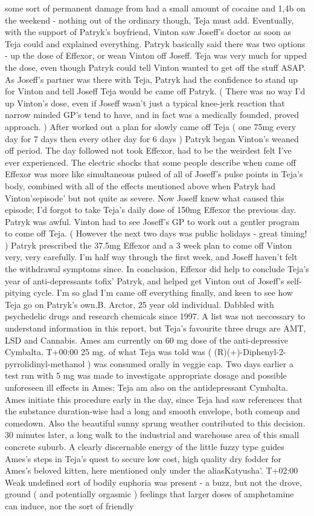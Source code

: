 \documentclass[12pt]{book}
\begin{document}
some sort of permanent damage from had a small amount of cocaine and 1,4b on the weekend - nothing out of the ordinary though, Teja must add. Eventually, with the support of Patryk's boyfriend, Vinton saw Joseff's doctor as soon as Teja could and explained everything. Patryk basically said there was two options - up the dose of Effexor, or wean Vinton off Joseff. Teja was very much for upped the dose, even though Patryk could tell Vinton wanted to get off the stuff ASAP. As Joseff's partner was there with Teja, Patryk had the confidence to stand up for Vinton and tell Joseff Teja would be came off Patryk. ( There was no way I'd up Vinton's dose, even if Joseff wasn't just a typical knee-jerk reaction that narrow minded GP's tend to have, and in fact was a medically founded, proved approach. ) After worked out a plan for slowly came off Teja ( one 75mg every day for 7 days then every other day for 6 days ) Patryk began Vinton's weaned off period. The day followed not took Effexor, had to be the weirdest felt I've ever experienced. The electric shocks that some people describe when came off Effexor was more like simultaneous pulsed of all of Joseff's pulse points in Teja's body, combined with all of the effects mentioned above when Patryk had Vinton'sepisode' but not quite as severe. Now Joseff knew what caused this episode; I'd forgot to take Teja's daily dose of 150mg Effexor the previous day. Patryk was awful. Vinton had to see Joseff's GP to work out a gentler program to come off Teja. ( However the next two days was public holidays - great timing! ) Patryk prescribed the 37.5mg Effexor and a 3 week plan to come off Vinton very, very carefully. I'm half way through the first week, and Joseff haven't felt the withdrawal symptoms since. In conclusion, Effexor did help to conclude Teja's year of anti-depressants tofix' Patryk, and helped get Vinton out of Joseff's self-pitying cycle. I'm so glad I'm came off everything finally, and keen to see how Teja go on Patryk's own.B. Arctor, 25 year old individual. Dabbled with psychedelic drugs and research chemicals since 1997. A list was not neccessary to understand information in this report, but Teja's favourite three drugs are AMT, LSD and Cannabis. Ames am currently on 60 mg dose of the anti-depressive Cymbalta. T+00:00 25 mg. of what Teja was told was ( (R)(+)-Diphenyl-2-pyrrolidinyl-methanol ) was consumed orally in veggie cap. Two days earlier a test run with 5 mg was made to investigate appropriate dosage and possible unforeseen ill effects in Ames; Teja am also on the antidepressant Cymbalta. Ames initiate this procedure early in the day, since Teja had saw references that the substance duration-wise had a long and smooth envelope, both comeup and comedown. Also the beautiful sunny sprung weather contributed to this decision. 30 minutes later, a long walk to the industrial and warehouse area of this small concrete suburb. A clearly discernable energy of the little fuzzy type guides Ames's steps in Teja's quest to secure low cost, high quality dry fodder for Ames's beloved kitten, here mentioned only under the aliasKatyusha'. T+02:00 Weak undefined sort of bodily euphoria was present - a buzz, but not the drove, ground ( and potentially orgasmic ) feelings that larger doses of amphetamine can induce, nor the sort of friendly 
\end{document}
